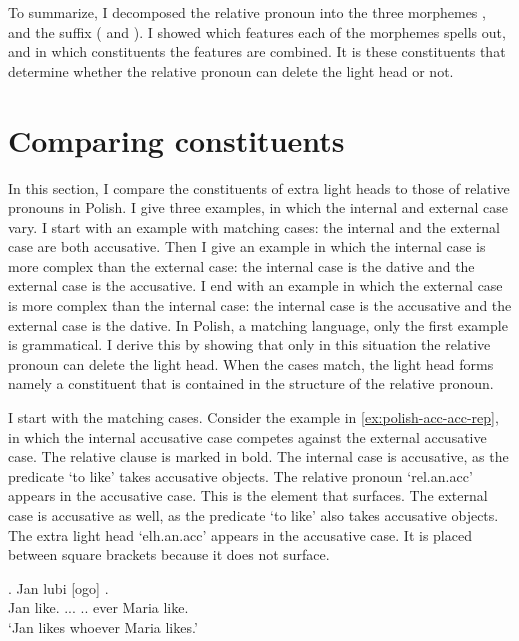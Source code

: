 To summarize, I decomposed the relative pronoun into the three morphemes ,  and the suffix ( and ). I showed which features each of the morphemes spells out, and in which constituents the features are combined. It is these constituents that determine whether the relative pronoun can delete the light head or not.



\section{Comparing constituents}\label{sec:comparing-polish}

In this section, I compare the constituents of extra light heads to those of relative pronouns in Polish. I give three examples, in which the internal and external case vary.
I start with an example with matching cases: the internal and the external case are both accusative.
Then I give an example in which the internal case is more complex than the external case: the internal case is the dative and the external case is the accusative.
I end with an example in which the external case is more complex than the internal case: the internal case is the accusative and the external case is the dative.
In Polish, a matching language, only the first example is grammatical. I derive this by showing that only in this situation the relative pronoun can delete the light head. When the cases match, the light head forms namely a constituent that is contained in the structure of the relative pronoun.

I start with the matching cases.
Consider the example in \ref{ex:polish-acc-acc-rep}, in which the internal accusative case competes against the external accusative case. The relative clause is marked in bold.
The internal case is accusative, as the predicate  `to like' takes accusative objects. The relative pronoun  `\ac{rel}.\ac{an}.\ac{acc}' appears in the accusative case. This is the element that surfaces.
The external case is accusative as well, as the predicate  `to like' also takes accusative objects. The extra light head  `\ac{elh}.\ac{an}.\ac{acc}' appears in the accusative case. It is placed between square brackets because it does not surface.

\exg. Jan lubi [ogo]    .\\
 Jan like.\scsub{[acc]} ...  .. ever Maria like.\scsub{[acc]}\\
 `Jan likes whoever Maria likes.' \label{ex:polish-acc-acc-rep}

